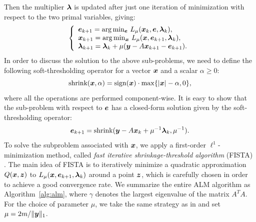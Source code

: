\documentclass[12pt,journal,draftcls,letterpaper,onecolumn]{IEEEtran}
\begin{document}
Then the multiplier $\boldsymbol{\lambda}$ is updated after just one iteration of minimization
with respect to the two primal variables, giving:
\begin{equation}
\left \{
\begin{array}{lll}
\e_{k+1}  =  \arg\min_{\e} \, L_{\mu} (\x_k,\e,\blamda_k),\\
\x_{k+1}  =  \arg\min_{\x} \, L_{\mu} (\x,\e_{k+1},\blamda_k),\\
\blamda_{k+1}  =  \blamda_k + \mu (\y - A\x_{k+1} - \e_{k+1}). \\
\end{array}
\right .
\label{eq:adm}
\end{equation}
In order to discuss the solution to the above sub-problems, we
need to define the following soft-thresholding operator for a
vector ${\boldsymbol{x}}$ and a scalar $\alpha \geq 0$:
\begin{equation}
\textup{shrink}({\boldsymbol{x}},\alpha) = \textup{sign}({\boldsymbol{x}})\cdot \max \{|{\boldsymbol{x}}| - \alpha, 0\},
\end{equation}
where all the operations are performed component-wise. It is
easy to show that the sub-problem with respect to $\boldsymbol{e}$ has a
closed-form solution given by the soft-thresholding operator:
\begin{equation}
\boldsymbol{e}_{k+1} = \textup{shrink}({\boldsymbol{y}} - A{\boldsymbol{x}}_k + \mu^{-1}\boldsymbol{\lambda}_k, \mu^{-1}).
\end{equation}
To solve the subproblem associated with ${\boldsymbol{x}}$, we
apply a first-order $\ell^1$-minimization method,
called \emph{fast iterative shrinkage-threshold algorithm}
(FISTA) \cite{BeckA2009}. The main idea of FISTA is to
iteratively minimize a quadratic approximation $Q({\boldsymbol{x}}, \boldsymbol{z})$ to
$L_{\mu} ({\boldsymbol{x}},\boldsymbol{e}_{k+1},\boldsymbol{\lambda}_k)$ around a point $\boldsymbol{z}$, which is
carefully chosen in order to achieve a good convergence
rate. We summarize the entire ALM
algorithm as Algorithm~\ref{alg:alm}, where $\gamma$ denotes the
largest eigenvalue of the matrix $A^TA$. For the choice of parameter $\mu$, we take the same strategy as
in \cite{YangJ2009-pp} and set $\mu = 2m / \|{\boldsymbol{y}}\|_1$.
\end{document}
